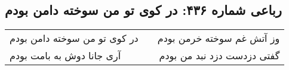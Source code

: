\begin{center}
\section*{رباعی شماره ۴۳۶: در کوی تو من سوخته دامن بودم}
\label{sec:sh436}
\begin{longtable}{l p{0.5cm} r}
در کوی تو من سوخته دامن بودم
&&
وز آتش غم سوخته خرمن بودم
\\
آری جانا دوش به بامت بودم
&&
گفتی دزدست دزد نبد من بودم
\\
\end{longtable}
\end{center}
